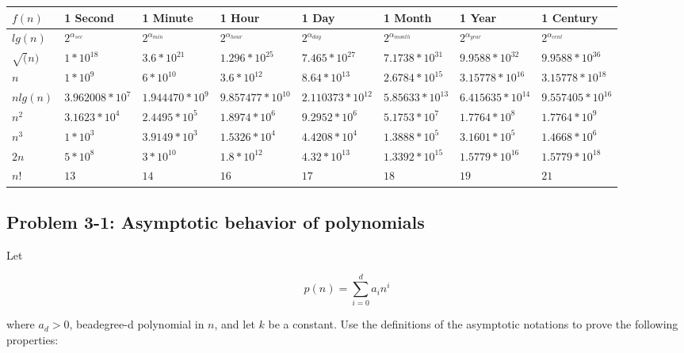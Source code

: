 \documentclass{article}
\begin{document}
\begin{longtable}[H]{|p{1.5cm}|p{1.5cm}|p{1.5cm}|p{1.5cm}|p{1.5cm}|p{1.5cm}|p{1.5cm}|p{1.5cm}|}
\hline
$f(n)$ & \textbf{1 Second} & \textbf{1 Minute} & \textbf{1 Hour} & \textbf{1 Day} & \textbf{1 Month} & \textbf{1 Year} & \textbf{1 Century} \\ \hline

 $lg(n)$ & $2^{\alpha_{sec}}$ & $2^{\alpha_{min}}$ & $2^{\alpha_{hour}}$ & $2^{\alpha_{day}}$ & $2^{\alpha_{month}}$ & $2^{\alpha_{year}}$ & $2^{\alpha_{cent}}$ \\ \hline
 
 $\sqrt(n)$ & $1*10^{18}$ & $3.6*10^{21}$ & $1.296*10^{25}$ & $7.465*10^{27}$ & $7.1738*10^{31}$ & $9.9588*10^{32}$ & $9.9588*10^{36}$ \\ \hline
 
 $n$ & $1*10^9$ & $6*10^{10}$ & $3.6*10^{12}$ & $8.64*10^{13}$ & $2.6784*10^{15}$ & $3.15778*10^{16}$ & $3.15778*10^{18}$ \\ \hline
 
 $n lg(n)$ & $3.962008*10^{7}$ & $1.944470*10^{9}$ & $9.857477*10^{10}$ & $2.110373*10^{12}$ & $5.85633*10^{13}$ & $6.415635*10^{14}$ & $9.557405*10^{16}$ \\ \hline
 
 $n^2$ & $3.1623*10^{4}$ & $2.4495*10^{5}$ & $1.8974*10^{6}$ & $9.2952*10^{6}$ & $5.1753*10^{7}$ & $1.7764*10^{8}$ & $1.7764*10^{9}$ \\ \hline
 
 $n^3$ & $1*10^{3}$ & $3.9149*10^{3}$ & $1.5326*10^{4}$ & $4.4208*10^{4}$ & $1.3888*10^{5}$ & $3.1601*10^{5}$ & $1.4668*10^{6}$ \\ \hline 

 $2n$ & $5*10^8$ & $3*10^{10}$ & $1.8*10^{12}$ & $4.32*10^{13}$ & $1.3392*10^{15}$ & $1.5779*10^{16}$ & $1.5779*10^{18}$ \\ \hline
 
 $n!$ & $13$ & $14$ & $16$ & $17$ & $18$ & $19$ & $21$ \\ \hline
\end{longtable}

\subsection{Problem 3-1: Asymptotic behavior of polynomials}
Let

$$p(n) = \sum_{i=0}^{d} a_i n^i$$

where $a_d > 0$, beadegree-d polynomial in $n$, and let $k$ be a constant. Use the
definitions of the asymptotic notations to prove the following properties:
\end{document}
